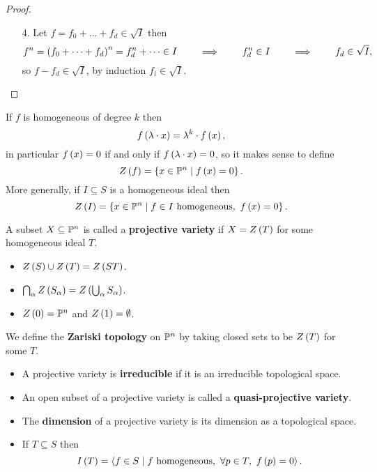 \begin{proof}
\hfill
\begin{itemize}
\item[4.] Let $ f = f_0 + \dots + f_d \in \sqrt{I} $ then
$$ f^n = \rb{f_0 + \dots + f_d}^n = f_d^n + \dots \in I \qquad \implies \qquad f_d^n \in I \qquad \implies \qquad f_d \in \sqrt{I}, $$
so $ f - f_d \in \sqrt{I} $, by induction $ f_i \in \sqrt{I} $.
\end{itemize}
\end{proof}

\begin{definition}
If $ f $ is homogeneous of degree $ k $ then
$$ f\rb{\lambda \cdot x} = \lambda^k \cdot f\rb{x}, $$
in particular $ f\rb{x} = 0 $ if and only if $ f\rb{\lambda \cdot x} = 0 $, so it makes sense to define
$$ Z\rb{f} = \cb{x \in \P^n \mid f\rb{x} = 0}. $$
More generally, if $ I \subseteq S $ is a homogeneous ideal then
$$ Z\rb{I} = \cb{x \in \P^n \mid f \in I \ \text{homogeneous}, \ f\rb{x} = 0}. $$
\end{definition}

\begin{definition}
A subset $ X \subseteq \P^n $ is called a \textbf{projective variety} if $ X = Z\rb{T} $ for some homogeneous ideal $ T $.
\end{definition}

\begin{proposition}
\hfill
\begin{itemize}
\item $ Z\rb{S} \cup Z\rb{T} = Z\rb{ST} $.
\item $ \bigcap_\alpha Z\rb{S_\alpha} = Z\rb{\bigcup_\alpha S_\alpha} $.
\item $ Z\rb{0} = \P^n $ and $ Z\rb{1} = \emptyset $.
\end{itemize}
\end{proposition}

\begin{definition}
We define the \textbf{Zariski topology} on $ \P^n $ by taking closed sets to be $ Z\rb{T} $ for some $ T $.
\end{definition}

\begin{definition}
\hfill
\begin{itemize}
\item A projective variety is \textbf{irreducible} if it is an irreducible topological space.
\item An open subset of a projective variety is called a \textbf{quasi-projective variety}.
\item The \textbf{dimension} of a projective variety is its dimension as a topological space.
\item If $ T \subseteq S $ then
$$ I\rb{T} = \ab{f \in S \mid f \ \text{homogeneous}, \ \forall p \in T, \ f\rb{p} = 0}. $$
\end{itemize}
\end{definition}

